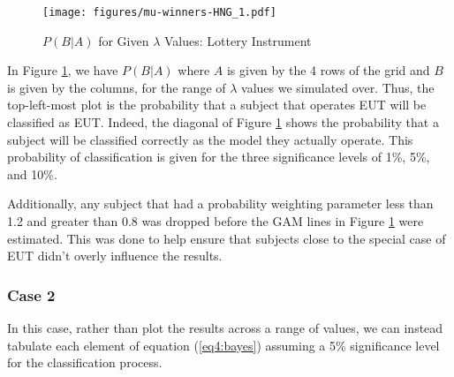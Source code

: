\documentclass[11pt,a4paper]{report}
\newcommand{\onlyinsubfile}[1]{#1}
\newcommand{\notinsubfile}[1]{}
\begin{document}
\begin{figure}[hp!]
	\center
	\caption{$P(B|A)$ for Given $\lambda$ Values: \textcite{Harrison2016} Lottery Instrument}
	\onlyinsubfile{
		\texttt{[image: figures/mu-winners-HNG\_1.pdf]}
	}
	\notinsubfile{
		\texttt{[image: ch4/figures/mu-winners-HNG\_1.pdf]}
	}
	\label{fig:HNG_mu_PBA}
\end{figure}

In Figure \ref{fig:HNG_mu_PBA}, we have $P(B|A)$ where $A$ is given by the 4 rows of the grid and $B$ is given by the columns, for the range of $\lambda$ values we simulated over.
Thus, the top-left-most plot is the probability that a subject that operates EUT will be classified as EUT.
Indeed, the diagonal of Figure \ref{fig:HNG_mu_PBA} shows the probability that a subject will be classified correctly as the model they actually operate.
This probability of classification is given for the three significance levels of 1\%, 5\%, and 10\%.

Additionally, any subject that had a probability weighting parameter less than 1.2 and greater than 0.8 was dropped before the GAM lines in Figure \ref{fig:HNG_mu_PBA} were estimated.
This was done to help ensure that subjects close to the special case of EUT didn't overly influence the results.

\subsubsection{Case 2}

In this case, rather than plot the results across a range of values, we can instead tabulate each element of equation (\ref{eq4:bayes}) assuming a 5\% significance level for the classification process.
\end{document}
